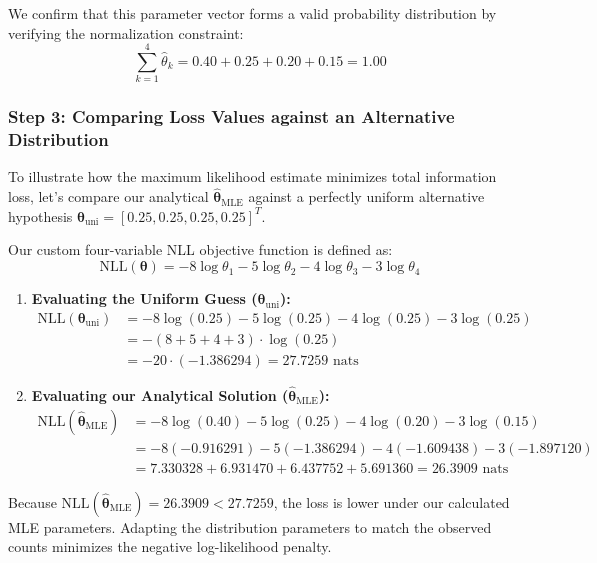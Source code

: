 \documentclass{article}
\begin{document}
We confirm that this parameter vector forms a valid probability distribution by verifying the normalization constraint:
\begin{equation}
\sum_{k=1}^{4} \hat{\theta}_k = 0.40 + 0.25 + 0.20 + 0.15 = \mathbf{1.00}
\end{equation}

\subsubsection{Step 3: Comparing Loss Values against an Alternative Distribution}
To illustrate how the maximum likelihood estimate minimizes total information loss, let's compare our analytical $\hat{\boldsymbol{\theta}}_{\text{MLE}}$ against a perfectly uniform alternative hypothesis $\boldsymbol{\theta}_{\text{uni}} = [0.25, 0.25, 0.25, 0.25]^T$. 

Our custom four-variable NLL objective function is defined as:
\begin{equation}
\text{NLL}(\boldsymbol{\theta}) = -8\log\theta_1 - 5\log\theta_2 - 4\log\theta_3 - 3\log\theta_4
\end{equation}

\begin{enumerate}
    \item \textbf{Evaluating the Uniform Guess ($\boldsymbol{\theta}_{\text{uni}}$):}
    \begin{align*}
    \text{NLL}(\boldsymbol{\theta}_{\text{uni}}) &= -8\log(0.25) - 5\log(0.25) - 4\log(0.25) - 3\log(0.25) \\
    &= -(8 + 5 + 4 + 3) \cdot \log(0.25) \\
    &= -20 \cdot (-1.386294) = \mathbf{27.7259} \text{ nats}
    \end{align*}
    
    \item \textbf{Evaluating our Analytical Solution ($\hat{\boldsymbol{\theta}}_{\text{MLE}}$):}
    \begin{align*}
    \text{NLL}(\hat{\boldsymbol{\theta}}_{\text{MLE}}) &= -8\log(0.40) - 5\log(0.25) - 4\log(0.20) - 3\log(0.15) \\
    &= -8(-0.916291) - 5(-1.386294) - 4(-1.609438) - 3(-1.897120) \\
    &= 7.330328 + 6.931470 + 6.437752 + 5.691360 = \mathbf{26.3909} \text{ nats}
    \end{align*}
\end{enumerate}

Because $\text{NLL}(\hat{\boldsymbol{\theta}}_{\text{MLE}}) = 26.3909 < 27.7259$, the loss is lower under our calculated MLE parameters. Adapting the distribution parameters to match the observed counts minimizes the negative log-likelihood penalty.
\end{document}
